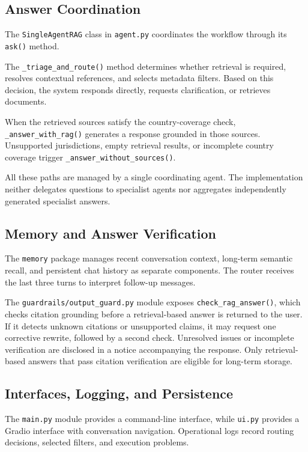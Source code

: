 \documentclass[a4paper,12pt]{report}
\begin{document}
\subsection{Answer Coordination}

The \texttt{SingleAgentRAG} class in \texttt{agent.py} coordinates
the workflow through its \texttt{ask()} method.

The \texttt{\_triage\_and\_route()} method determines whether
retrieval is required, resolves contextual references, and selects
metadata filters. Based on this decision, the system responds
directly, requests clarification, or retrieves documents.

When the retrieved sources satisfy the country-coverage check,
\texttt{\_answer\_with\_rag()} generates a response grounded in
those sources. Unsupported jurisdictions, empty retrieval results,
or incomplete country coverage trigger
\texttt{\_answer\_without\_sources()}.

All these paths are managed by a single coordinating agent.
The implementation neither delegates questions to specialist
agents nor aggregates independently generated specialist answers.

\subsection{Memory and Answer Verification}

The \texttt{memory} package manages recent conversation context,
long-term semantic recall, and persistent chat history as separate
components. The router receives the last three turns to interpret
follow-up messages.

The \texttt{guardrails/output\_guard.py} module exposes
\texttt{check\_rag\_answer()}, which checks citation grounding
before a retrieval-based answer is returned to the user. If it
detects unknown citations or unsupported claims, it may request
one corrective rewrite, followed by a second check. Unresolved
issues or incomplete verification are disclosed in a notice
accompanying the response. Only retrieval-based answers that
pass citation verification are eligible for long-term storage.

\subsection{Interfaces, Logging, and Persistence}

The \texttt{main.py} module provides a command-line interface,
while \texttt{ui.py} provides a Gradio interface with conversation
navigation. Operational logs record routing decisions, selected
filters, and execution problems.
\end{document}
